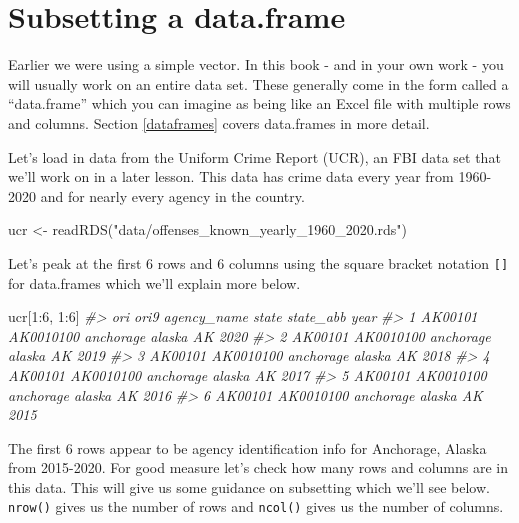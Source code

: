 \documentclass[
]{krantz}
\makeatletter
\newenvironment{Shaded}{\begin{snugshade}}{\end{snugshade}}
\newcommand{\CommentTok}[1]{\textcolor[rgb]{0.37,0.37,0.37}{\textit{#1}}}
\newcommand{\DecValTok}[1]{\textcolor[rgb]{0.06,0.06,0.06}{#1}}
\newcommand{\FunctionTok}[1]{\textcolor[rgb]{0,0,0}{#1}}
\newcommand{\NormalTok}[1]{#1}
\newcommand{\OtherTok}[1]{\textcolor[rgb]{0.37,0.37,0.37}{#1}}
\newcommand{\SpecialCharTok}[1]{\textcolor[rgb]{0,0,0}{#1}}
\newcommand{\StringTok}[1]{\textcolor[rgb]{0.5,0.5,0.5}{#1}}
\newenvironment{kframe}{%
\medskip{}
\setlength{\fboxsep}{.8em}
 \def\at@end@of@kframe{}%
 \ifinner\ifhmode%
  \def\at@end@of@kframe{\end{minipage}}%
  \begin{minipage}{\columnwidth}%
 \fi\fi%
 \def\FrameCommand##1{\hskip\@totalleftmargin \hskip-\fboxsep
 \colorbox{shadecolor}{##1}\hskip-\fboxsep
     \hskip-\linewidth \hskip-\@totalleftmargin \hskip\columnwidth}%
 \MakeFramed {\advance\hsize-\width
   \@totalleftmargin\z@ \linewidth\hsize
   \@setminipage}}%
 {\par\unskip\endMakeFramed%
 \at@end@of@kframe}
\renewenvironment{Shaded}{\begin{kframe}}{\end{kframe}}
\makeatother
\begin{document}
\hypertarget{subsetting-a-data.frame}{%
\section{Subsetting a
data.frame}\label{subsetting-a-data.frame}}

Earlier we were using a simple vector. In this book - and in
your own work - you will usually work on an entire data set.
These generally come in the form called a ``data.frame''
which you can imagine as being like an Excel file with
multiple rows and columns. Section \ref{dataframes} covers
data.frames in more detail.

Let's load in data from the Uniform Crime Report (UCR), an
FBI data set that we'll work on in a later lesson. This data
has crime data every year from 1960-2020 and for nearly
every agency in the country.

\begin{Shaded}
\begin{Highlighting}[]
\NormalTok{ucr }\OtherTok{\textless{}{-}} \FunctionTok{readRDS}\NormalTok{(}\StringTok{"data/offenses\_known\_yearly\_1960\_2020.rds"}\NormalTok{)}
\end{Highlighting}
\end{Shaded}

Let's peak at the first 6 rows and 6 columns using the
square bracket notation \texttt{{[}{]}} for data.frames
which we'll explain more below.

\begin{Shaded}
\begin{Highlighting}[]
\NormalTok{ucr[}\DecValTok{1}\SpecialCharTok{:}\DecValTok{6}\NormalTok{, }\DecValTok{1}\SpecialCharTok{:}\DecValTok{6}\NormalTok{]}
\CommentTok{\#\textgreater{}       ori      ori9 agency\_name  state state\_abb year}
\CommentTok{\#\textgreater{} 1 AK00101 AK0010100   anchorage alaska        AK 2020}
\CommentTok{\#\textgreater{} 2 AK00101 AK0010100   anchorage alaska        AK 2019}
\CommentTok{\#\textgreater{} 3 AK00101 AK0010100   anchorage alaska        AK 2018}
\CommentTok{\#\textgreater{} 4 AK00101 AK0010100   anchorage alaska        AK 2017}
\CommentTok{\#\textgreater{} 5 AK00101 AK0010100   anchorage alaska        AK 2016}
\CommentTok{\#\textgreater{} 6 AK00101 AK0010100   anchorage alaska        AK 2015}
\end{Highlighting}
\end{Shaded}

The first 6 rows appear to be agency identification info for
Anchorage, Alaska from 2015-2020. For good measure let's
check how many rows and columns are in this data. This will
give us some guidance on subsetting which we'll see below.
\texttt{nrow()} gives us the number of rows and
\texttt{ncol()} gives us the number of columns.
\end{document}
